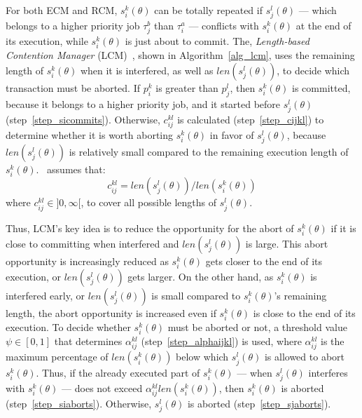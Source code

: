 \documentclass[prodmode,acmtecs]{acmsmall}
\begin{document}
For both ECM and RCM, $s_{i}^{k}(\theta)$ can be totally repeated if $s_{j}^{l}(\theta)$ --- which belongs to a higher priority job $\tau_{j}^b$ than $\tau_{i}^a$ --- conflicts with $s_{i}^{k}(\theta)$
at the end of its execution, while $s_{i}^{k}(\theta)$ is just about
to commit. The, \textit{Length-based Contention Manager} (LCM)~\cite{lcmdac2012}, shown in Algorithm~\ref{alg_lcm}, uses the remaining length of $s_{i}^{k}(\theta)$ when it is interfered,
as well as $len(s_{j}^{l}(\theta))$, to decide which transaction must be aborted. If $p_i^k$ is greater than $p_j^l$, then $s_i^k(\theta)$ is committed, because it belongs to a higher priority job, and it started before $s_j^l(\theta)$ (step~\ref{step_sicommits}). Otherwise, $c_{ij}^{kl}$ is calculated (step~\ref{step_cijkl}) to determine whether it is worth aborting $s_i^k(\theta)$ in favor of $s_j^l(\theta)$, because $len(s_j^l(\theta))$ is relatively small compared to the remaining execution length of $s_i^k(\theta)$.~\cite{lcmdac2012} assumes that:
\begin{equation}
c_{ij}^{kl}=len(s_{j}^{l}(\theta))/len(s_{i}^{k}(\theta))
\label{cm_eq}\end{equation}
where $c_{ij}^{kl}\in]0,\infty[$, to cover all possible lengths of $s_{j}^{l}(\theta)$.


Thus, LCM's key idea is to reduce the opportunity for the abort of $s_{i}^{k}(\theta)$ if it is close to committing when interfered and $len(s_{j}^{l}(\theta))$ is large. This abort opportunity is increasingly reduced as $s_{i}^{k}(\theta)$ gets closer to the end of its execution, or $len(s_{j}^{l}(\theta))$ gets larger. On the other hand, as $s_{i}^{k}(\theta)$ is interfered early, or $len(s_{j}^{l}(\theta))$ is small compared to $s_{i}^{k}(\theta)$'s remaining length, the abort opportunity is increased even if $s_i^k (\theta)$ is close to the end of its execution. To decide whether $s_{i}^{k}(\theta)$ must be aborted or not, a threshold value $\psi\in[0,1]$ that determines $\alpha_{ij}^{kl}$ (step~\ref{step_alphaijkl}) is used, where $\alpha_{ij}^{kl}$ is the maximum percentage of $len(s_i^k(\theta))$ below which $s_j^l(\theta)$ is allowed to abort $s_i^k(\theta)$. Thus, if the already executed part of $s_i^k(\theta)$ --- when $s_j^l(\theta)$ interferes with $s_i^k(\theta)$ --- does not exceed $\alpha_{ij}^{kl}len(s_i^k(\theta))$, then $s_i^k(\theta)$ is aborted (step~\ref{step_siaborts}). Otherwise, $s_j^l(\theta)$ is aborted (step~\ref{step_sjaborts}).
\end{document}
